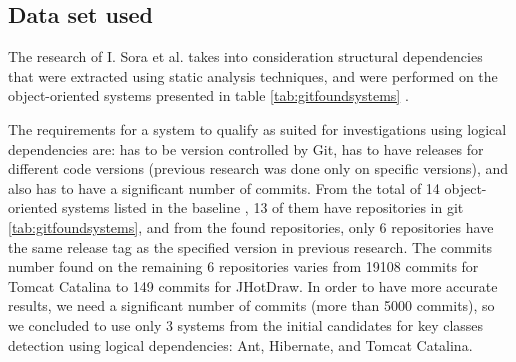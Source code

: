 \documentclass[runningheads]{comsis2}
\begin{document}
\subsection{Data set used}
\label{sec:dataset}


The research of I. Sora et al. takes into consideration structural dependencies that were extracted using static analysis techniques, and were performed on the object-oriented systems presented in table \ref{tab:gitfoundsystems} \cite{Finding-key-classes}.

The requirements for a system to qualify as suited for investigations using logical dependencies are: has to be version controlled by Git, has to have releases for different code versions (previous research was done only on specific versions), and also has to have a significant number of commits. 
From the total of 14 object-oriented systems listed in the baseline \cite{Finding-key-classes}, 13 of them have repositories in git \ref{tab:gitfoundsystems}, and from the found repositories, only 6 repositories have the same release tag as the specified version in previous research.
The commits number found on the remaining 6 repositories varies from 19108 commits for Tomcat Catalina to 149 commits for JHotDraw. In order to have more accurate results, we need a significant number of commits (more than 5000 commits), so we concluded to use only 3 systems from the initial candidates for key classes detection using logical dependencies:  Ant, Hibernate, and Tomcat Catalina.  

\begin{table}
\renewcommand{\arraystretch}{1}
\caption{Systems and versions of the systems found in Git. }
\label{tab:gitfoundsystems}
\centering
{}
\end{table}
\end{document}
